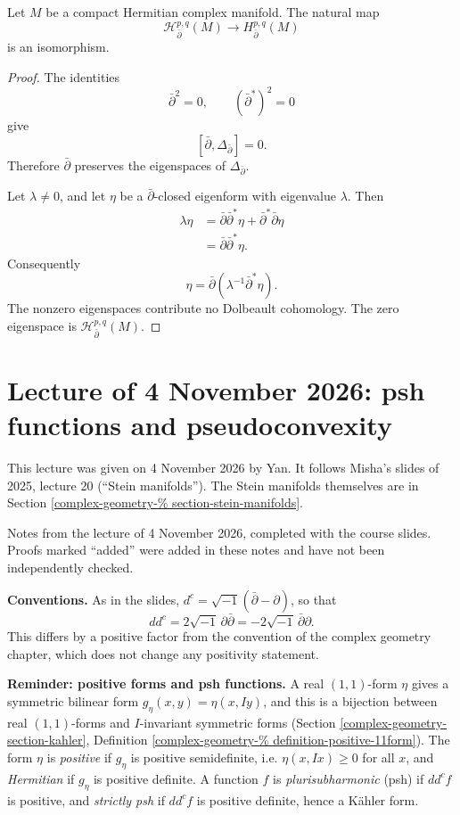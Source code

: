 \begin{theorem}
\label{theorem-hodge-dolbeault}
Let $M$ be a compact Hermitian complex
manifold. The natural map
$$
\mathcal{H}^{p,q}_{\bar\partial}(M)
\longrightarrow
H^{p,q}_{\bar\partial}(M)
$$
is an isomorphism.
\end{theorem}

\begin{proof}
The identities
$$
\bar\partial^2=0,
\qquad
(\bar\partial^*)^2=0
$$
give
$$
[\bar\partial,
\Delta_{\bar\partial}]=0.
$$
Therefore $\bar\partial$ preserves the
eigenspaces of $\Delta_{\bar\partial}$.

Let $\lambda\neq0$, and let $\eta$ be a
$\bar\partial$-closed eigenform with
eigenvalue $\lambda$. Then
$$
\begin{aligned}
\lambda\eta
&=\bar\partial\bar\partial^*\eta
+\bar\partial^*\bar\partial\eta\\
&=\bar\partial\bar\partial^*\eta.
\end{aligned}
$$
Consequently
$$
\eta
=\bar\partial
(\lambda^{-1}\bar\partial^*\eta).
$$
The nonzero eigenspaces contribute no
Dolbeault cohomology. The zero eigenspace is
$\mathcal{H}^{p,q}_{\bar\partial}(M)$.
\end{proof}

\section{Lecture of 4 November 2026: psh
functions and pseudoconvexity}
\label{section-lecture-psh-pseudoconvexity}

\noindent
This lecture was given on 4 November 2026 by
Yan. It follows Misha's slides of 2025,
lecture 20 (``Stein manifolds''). The Stein
manifolds themselves are in Section
\ref{complex-geometry-%
section-stein-manifolds}.

\medskip\noindent
Notes from the lecture of 4 November 2026,
completed with the course slides.
Proofs marked ``added'' were added in these
notes and have not been independently
checked.

\medskip\noindent
{\bf Conventions.} As in the slides,
$d^c=\sqrt{-1}(\bar\partial-\partial)$, so
that
$$
dd^c=2\sqrt{-1}\,\partial\bar\partial
=-2\sqrt{-1}\,\bar\partial\partial.
$$
This differs by a positive factor from the
convention of the complex geometry chapter,
which does not change any positivity
statement.

\medskip\noindent
{\bf Reminder: positive forms and psh
functions.} A real $(1,1)$-form $\eta$ gives
a symmetric bilinear form
$g_\eta(x,y)=\eta(x,Iy)$, and this is a
bijection between real $(1,1)$-forms and
$I$-invariant symmetric forms (Section
\ref{complex-geometry-section-kahler},
Definition
\ref{complex-geometry-%
definition-positive-11form}).
The form $\eta$ is \emph{positive} if
$g_\eta$ is positive semidefinite, i.e.
$\eta(x,Ix)\geq 0$ for all $x$, and
\emph{Hermitian} if $g_\eta$ is positive
definite. A function $f$ is
\emph{plurisubharmonic} (psh) if $dd^cf$ is
positive, and \emph{strictly psh} if $dd^cf$
is positive definite, hence a K\"ahler form.

